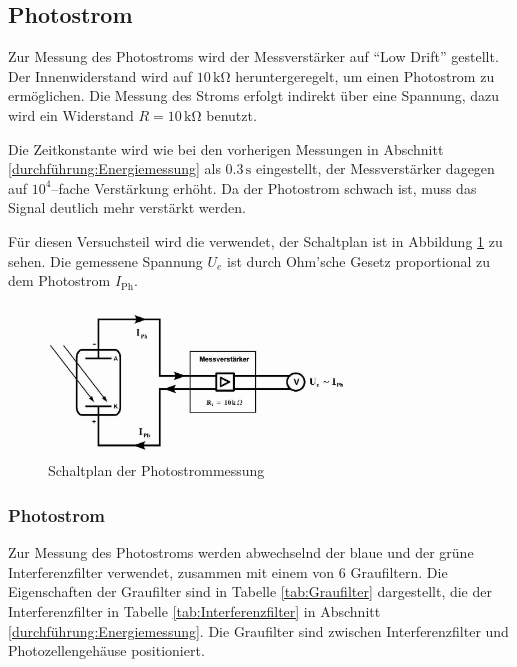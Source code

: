 \documentclass[12pt,a4paper]{scrartcl}
\numberwithin{equation}{section} %
\begin{document}
\subsection{Photostrom}

Zur Messung des Photostroms wird der Messverstärker auf ``Low Drift'' gestellt. Der Innenwiderstand wird auf $10\mathrm{\,k\Omega}$ heruntergeregelt, um einen Photostrom zu ermöglichen. Die Messung des Stroms erfolgt indirekt über eine Spannung, dazu wird ein Widerstand $R=10\mathrm{\,k\Omega}$ benutzt.

Die Zeitkonstante wird wie bei den vorherigen Messungen in Abschnitt \ref{durchführung:Energiemessung} als $0.3\mathrm{\,s}$ eingestellt, der Messverstärker dagegen auf $10^4$--fache Verstärkung erhöht. Da der Photostrom schwach ist, muss das Signal deutlich mehr verstärkt werden.

Für diesen Versuchsteil wird die  verwendet, der Schaltplan ist in Abbildung \ref{fig:Schaltplan Photostrom} zu sehen. Die gemessene Spannung $U_e$ ist durch Ohm'sche Gesetz proportional zu dem Photostrom $I_\mathrm{Ph}$.

\begin{figure}[h!]
	\centering
	\includegraphics[width=0.7\textwidth]{../media/B1.4/Schaltplan_Photostrom.jpg}
	\caption{Schaltplan der Photostrommessung}
	\label{fig:Schaltplan Photostrom}
\end{figure}

\subsubsection{Photostrom}
Zur Messung des Photostroms werden abwechselnd der blaue und der grüne Interferenzfilter verwendet, zusammen mit einem von $6$ Graufiltern. Die Eigenschaften der Graufilter sind in Tabelle \ref{tab:Graufilter} dargestellt, die der Interferenzfilter in Tabelle \ref{tab:Interferenzfilter} in Abschnitt \ref{durchführung:Energiemessung}. Die Graufilter sind zwischen Interferenzfilter und Photozellengehäuse positioniert.
\end{document}
